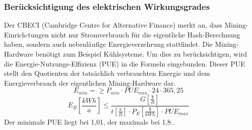 \documentclass[12pt]{article}
\begin{document}
\subsubsection{Berücksichtigung des elektrischen Wirkungsgrades}
Der CBECI (Cambridge Centre for Alternative Finance) merkt an, dass Mining-Einrich-tungen nicht nur Stromverbrauch für die eigentliche Hash-Berechnung haben, sondern auch nebenläufige Energieverzehrung stattfindet. Die Mining-Hardware benötigt zum Beispiel Kühlsysteme. Um dies zu berücksichtigen, wird die Energie-Nutzungs-Effizienz (PUE) in die Formeln eingebunden. Dieser PUE stellt den Quotienten der tatsächlich verbrauchten Energie und dem Energieverbrauch der eigentlichen Mining-Hardware dar.
\[E_{min}=\geq P_{min}\cdot PUE_{min}\cdot 24\cdot 365,25\]
\[E_B\left[\frac{kWh}{a}\right]\leq\frac{G\left[\frac{\$}{B}\right]}{t \left[\frac{a}{B}\right]\cdot P_E\left[\frac{\$}{kWh}\right]\cdot PUE_{max}}\]
Der minimale PUE liegt bei 1,01, der maximale bei 1,8..
\end{document}
